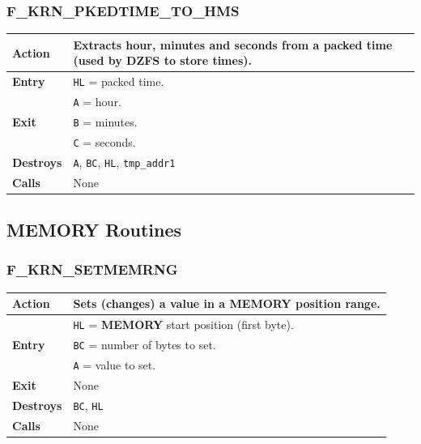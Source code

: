 \documentclass[a4paper,11pt]{article}
\begin{document}
        \subsubsection{F\_KRN\_PKEDTIME\_TO\_HMS}
        \label{func:fkrnpkedtimetohms}
        \begin{tabular}{l p{9cm}}
            \hline\textbf{Action}
            & Extracts hour, minutes and seconds from a packed time (used by
            DZFS to store times).\\
            \hline\textbf{Entry} & \texttt{HL} = packed time.\\
            \hline\multirow[t]{3}{4em}{\textbf{Exit}}
            & \texttt{A} = hour.\\
            & \texttt{B} = minutes.\\
            & \texttt{C} = seconds.\\
            \hline\textbf{Destroys} & \texttt{A}, \texttt{BC}, \texttt{HL},
            \texttt{tmp\_addr1}\\
            \hline\textbf{Calls} & None\\
            \hline
        \end{tabular}

    \subsection{MEMORY Routines}

        \subsubsection{F\_KRN\_SETMEMRNG}
        \label{func:fkrnsetmemrng}
        \begin{tabular}{l p{9cm}}
            \hline\textbf{Action}
            & Sets (changes) a value in a \textbf{MEMORY} position range.\\
            \hline\multirow[t]{3}{4em}{\textbf{Entry}}
            & \texttt{HL} = \textbf{MEMORY} start position (first byte).\\
            & \texttt{BC} = number of bytes to set.\\
            & \texttt{A} = value to set.\\
            \hline\textbf{Exit} & None\\
            \hline\textbf{Destroys} & \texttt{BC}, \texttt{HL}\\
            \hline\textbf{Calls} & None\\
            \hline
        \end{tabular}
\end{document}
